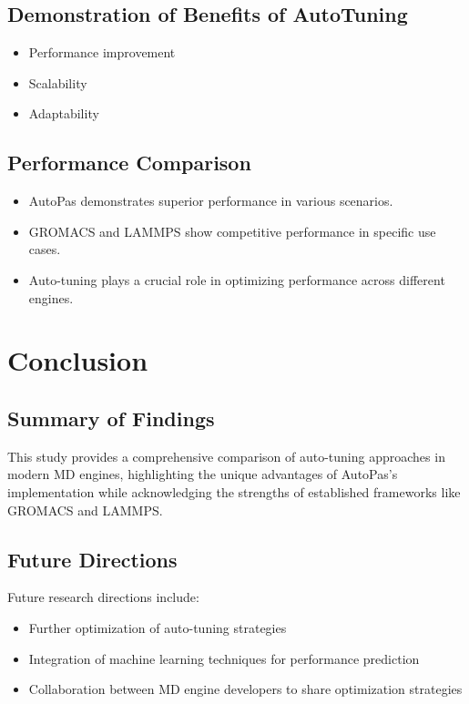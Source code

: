 \documentclass[conference]{IEEEtran}
\begin{document}
\subsection{Demonstration of Benefits of AutoTuning}
\begin{itemize}
    \item Performance improvement
    \item Scalability
    \item Adaptability
\end{itemize}

\subsection{Performance Comparison}
\begin{itemize}
    \item AutoPas demonstrates superior performance in various scenarios.
    \item GROMACS and LAMMPS show competitive performance in specific use cases.
    \item Auto-tuning plays a crucial role in optimizing performance across different engines.
\end{itemize}



\section{Conclusion}

\subsection{Summary of Findings}

This study provides a comprehensive comparison of auto-tuning approaches in modern MD engines, highlighting the unique advantages of AutoPas's implementation while acknowledging the strengths of established frameworks like GROMACS and LAMMPS.

\subsection{Future Directions}

Future research directions include:
\begin{itemize}
    \item Further optimization of auto-tuning strategies
    \item Integration of machine learning techniques for performance prediction
    \item Collaboration between MD engine developers to share optimization strategies
\end{itemize}

\cite{Gratl2019AutoPasAF}







\newpage
\newpage
\tableofcontents
\end{document}
